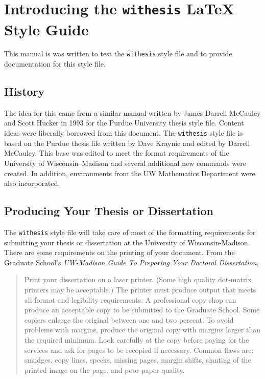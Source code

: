 

\chapter{Introducing the {\tt withesis} \LaTeX{} Style Guide}
This manual is was written to test the {\tt withesis} style
file and to provide documentation for this style file.  

\section{History}
The
idea for this came from a similar manual written by James Darrell
McCauley and Scott Hucker in 1993 for the Purdue University thesis
style file.  Content ideas were liberally borrowed from this document.
The {\tt withesis} style file is based on the Purdue thesis file
written by Dave Kraynie and edited by Darrell McCauley.  This base was
edited to meet the format requirements of the University of 
Wisconsin--Madison and several additional new commands were created.
In addition, environments from the UW Mathematics Department were also
incorporated.

\section{Producing Your Thesis or Dissertation}
The {\tt withesis} style file will take care of most of the formatting
requirements for submitting your thesis or dissertation at the University
of Wisconsin-Madison.  There are some requirements on the printing of your
document.  From the Graduate School's {\em UW-Madison Guide To Preparing 
Your Doctoral Dissertation},
\begin{quote}\singlespace
Print your dissertation on a laser printer. (Some high quality dot-matrix
printers may be acceptable.) The printer must produce output that
meets all format and legibility requirements. A professional copy shop
can produce an acceptable copy to be submitted to the Graduate School.
Some copiers enlarge the original between one and two percent. To avoid
problems with margins, produce the original copy with margins larger than
the required minimum. Look carefully at the copy before paying for the
services and ask for pages to be recopied if necessary. Common flaws are:
smudges, copy lines, specks, missing pages, margin shifts, slanting of
the printed image on the page, and poor paper quality.
\end{quote}

